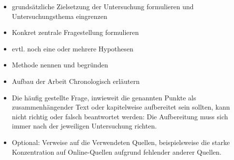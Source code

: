 \begin{itemize}
	\item grundsätzliche Zielsetzung der Untersuchung formulieren und Untersuchungsthema eingrenzen
	\item Konkret zentrale Fragestellung formulieren
	\item evtl. noch eine oder mehrere Hypothesen
	\item Methode nennen und begründen
	\item Aufbau der Arbeit Chronologisch erläutern
	\item Die häufig gestellte Frage, inwieweit die genannten Punkte als zusammenhängender Text oder kapitelweise aufbereitet sein sollten, kann nicht richtig oder falsch beantwortet werden: Die Aufbereitung muss sich immer nach der jeweiligen Untersuchung richten.
	\item Optional: Verweise auf die Verwendeten Quellen, beispielsweise die starke Konzentration auf Online-Quellen aufgrund fehlender anderer Quellen.
\end{itemize}